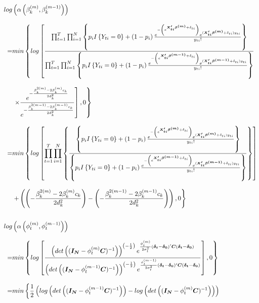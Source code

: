 \documentclass[12pt,a4paper]{article}
\begin{document}
\begin{CJK}{UTF8}{bkai}
\begin{align*}
 \setlength\abovedisplayskip{25pt}
 \setlength\belowdisplayskip{25pt}
 log & \left(\alpha\left(\beta_k^{(m)},\beta_k^{(m-1)}\right)\right) \\[3mm]
 = &
 min\left\{ log \left[\frac{\prod_{t=1}^T\prod_{i=1}^N \left\{ p_i I\left\{ Y_{ti} = 0\right\}+\left(1-p_i\right)\frac{e^{-\left(e^{\bm{X_{ti}^\prime\beta^{(m)}}+\delta_{ti}}\right)}e^{(\bm{X_{ti}^\prime\bm{\beta}^{(m)}}+\delta_{ti})y_{ti}}}{y_{ti}!}\right\}}{\prod_{t=1}^T\prod_{i=1}^N \left\{ p_i I\left\{ Y_{ti} = 0\right\}+\left(1-p_i\right)\frac{e^{-\left(e^{\bm{X_{ti}^\prime\bm{\beta}^{(m-1)}}+\delta_{ti}}\right)}e^{(\bm{X_{ti}^\prime\beta^{(m-1)}}+\delta_{ti})y_{ti}}}{y_{ti}!}\right\}}  \right.\right. \\[3mm]
 & \left.\left.\times \frac{ e^{-\frac{\beta_{k}^{2(m)}-2\beta_k^{(m)} c_k}{2 d_k^2}}}{ e^{-\frac{\beta_{k}^{2(m-1)}-2\beta_k^{(m-1)} c_k}{2 d_k^2}}}\right],0\right\}\\[3mm]
 = &
 min\left\{ log \left[\prod_{t=1}^T\prod_{i=1}^N \left\{\frac{\left\{ p_i I\left\{ Y_{ti} = 0\right\}+\left(1-p_i\right)\frac{e^{-\left(e^{\bm{X_{ti}^\prime\bm{\beta}^{(m)}}+\delta_{ti}}\right)}e^{(\bm{X_{ti}^\prime\bm{\beta}^{(m)}}+\delta_{ti})y_{ti}}}{y_{ti}!}\right\}}{\left\{ p_i I\left\{ Y_{ti} = 0\right\}+\left(1-p_i\right)\frac{e^{-\left(e^{\bm{X_{ti}^\prime\bm{\beta}^{(m-1)}}+\delta_{ti}}\right)}e^{(\bm{X_{ti}^\prime\bm{\beta}^{(m-1)}}+\delta_{ti})y_{ti}}}{y_{ti}!}\right\}}\right\}\right]\right.\\[3mm]
& \left. +
\left(\left(-\frac{\beta_{k}^{2(m)}-2\beta_k^{(m)} c_k}{2 d_k^2}\right)-\left(-\frac{\beta_{k}^{2(m-1)}-2\beta_k^{(m-1)} c_k}{2 d_k^2}\right)\right),0\right\}
 \\ \hspace*{\fill} \\
 log & \left(\alpha\left(\phi_t^{(m)},\phi_t^{(m-1)}\right)\right) \\[3mm]
 = &
min\left\{log\left[\frac{ \left(det\left((\bm{I_N}-\phi_t^{(m)}\bm{C})^{-1}\right)\right)^{\left(-\frac{1}{2}\right)} e^{\frac{\phi_t^{(m)}}{2\sigma_t^2}(\bm{\delta_t}-\bm{\delta_0})^\prime \bm{C}(\bm{\delta_t}-\bm{\delta_0})} }{ \left(det\left((\bm{I_N}-\phi_t^{(m-1)}\bm{C})^{-1}\right)\right)^{\left(-\frac{1}{2}\right)} e^{\frac{\phi_t^{(m-1)}}{2\sigma_t^2}(\bm{\delta_t}-\bm{\delta_0})^\prime \bm{C}(\bm{\delta_t}-\bm{\delta_0})} }\right],0\right\}\\[3mm]
 = &
min\left\{\frac{1}{2}\left(log\left(det\left((\bm{I_N}-\phi_t^{(m-1)}\bm{C})^{-1}\right)\right)-log\left(det\left((\bm{I_N}-\phi_t^{(m)}\bm{C})^{-1}\right)\right)\right)\right. \\[3mm]

\end{align*}
\end{CJK}
\end{document}
